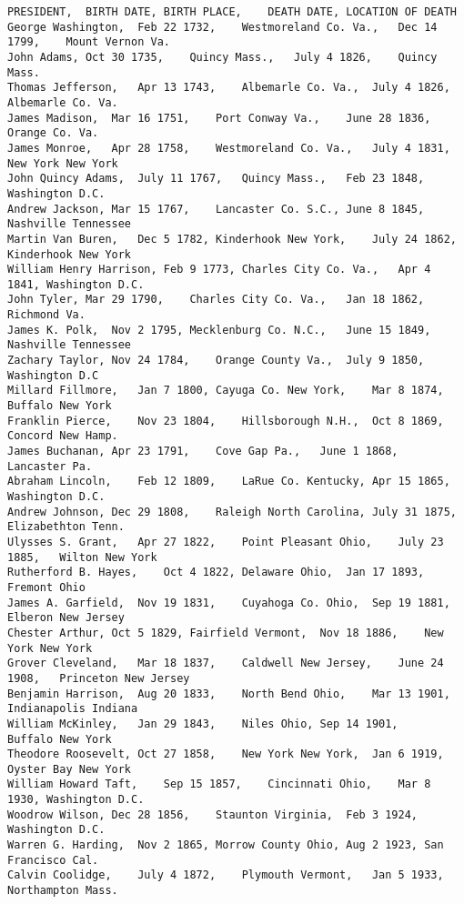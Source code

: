\begin{lstlisting}
PRESIDENT,  BIRTH DATE, BIRTH PLACE,    DEATH DATE, LOCATION OF DEATH
George Washington,  Feb 22 1732,    Westmoreland Co. Va.,   Dec 14 1799,    Mount Vernon Va.
John Adams, Oct 30 1735,    Quincy Mass.,   July 4 1826,    Quincy Mass.
Thomas Jefferson,   Apr 13 1743,    Albemarle Co. Va.,  July 4 1826,    Albemarle Co. Va.
James Madison,  Mar 16 1751,    Port Conway Va.,    June 28 1836,   Orange Co. Va.
James Monroe,   Apr 28 1758,    Westmoreland Co. Va.,   July 4 1831,    New York New York
John Quincy Adams,  July 11 1767,   Quincy Mass.,   Feb 23 1848,    Washington D.C.
Andrew Jackson, Mar 15 1767,    Lancaster Co. S.C., June 8 1845,    Nashville Tennessee
Martin Van Buren,   Dec 5 1782, Kinderhook New York,    July 24 1862,   Kinderhook New York
William Henry Harrison, Feb 9 1773, Charles City Co. Va.,   Apr 4 1841, Washington D.C.
John Tyler, Mar 29 1790,    Charles City Co. Va.,   Jan 18 1862,    Richmond Va.
James K. Polk,  Nov 2 1795, Mecklenburg Co. N.C.,   June 15 1849,   Nashville Tennessee
Zachary Taylor, Nov 24 1784,    Orange County Va.,  July 9 1850,    Washington D.C
Millard Fillmore,   Jan 7 1800, Cayuga Co. New York,    Mar 8 1874, Buffalo New York
Franklin Pierce,    Nov 23 1804,    Hillsborough N.H.,  Oct 8 1869, Concord New Hamp.
James Buchanan, Apr 23 1791,    Cove Gap Pa.,   June 1 1868,    Lancaster Pa.
Abraham Lincoln,    Feb 12 1809,    LaRue Co. Kentucky, Apr 15 1865,    Washington D.C.
Andrew Johnson, Dec 29 1808,    Raleigh North Carolina, July 31 1875,   Elizabethton Tenn.
Ulysses S. Grant,   Apr 27 1822,    Point Pleasant Ohio,    July 23 1885,   Wilton New York
Rutherford B. Hayes,    Oct 4 1822, Delaware Ohio,  Jan 17 1893,    Fremont Ohio
James A. Garfield,  Nov 19 1831,    Cuyahoga Co. Ohio,  Sep 19 1881,    Elberon New Jersey
Chester Arthur, Oct 5 1829, Fairfield Vermont,  Nov 18 1886,    New York New York
Grover Cleveland,   Mar 18 1837,    Caldwell New Jersey,    June 24 1908,   Princeton New Jersey
Benjamin Harrison,  Aug 20 1833,    North Bend Ohio,    Mar 13 1901,    Indianapolis Indiana
William McKinley,   Jan 29 1843,    Niles Ohio, Sep 14 1901,    Buffalo New York
Theodore Roosevelt, Oct 27 1858,    New York New York,  Jan 6 1919, Oyster Bay New York
William Howard Taft,    Sep 15 1857,    Cincinnati Ohio,    Mar 8 1930, Washington D.C.
Woodrow Wilson, Dec 28 1856,    Staunton Virginia,  Feb 3 1924, Washington D.C.
Warren G. Harding,  Nov 2 1865, Morrow County Ohio, Aug 2 1923, San Francisco Cal.
Calvin Coolidge,    July 4 1872,    Plymouth Vermont,   Jan 5 1933, Northampton Mass.

\end{lstlisting}
